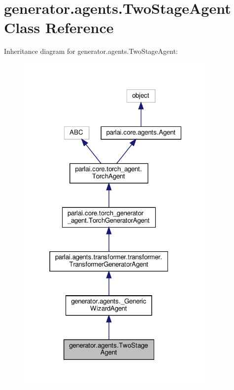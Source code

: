 \hypertarget{classgenerator_1_1agents_1_1TwoStageAgent}{}\section{generator.\+agents.\+Two\+Stage\+Agent Class Reference}
\label{classgenerator_1_1agents_1_1TwoStageAgent}


Inheritance diagram for generator.\+agents.\+Two\+Stage\+Agent\+:
\nopagebreak
\begin{figure}[H]
\begin{center}
\leavevmode
\includegraphics[width=280pt]{classgenerator_1_1agents_1_1TwoStageAgent__inherit__graph}
\end{center}
\end{figure}


